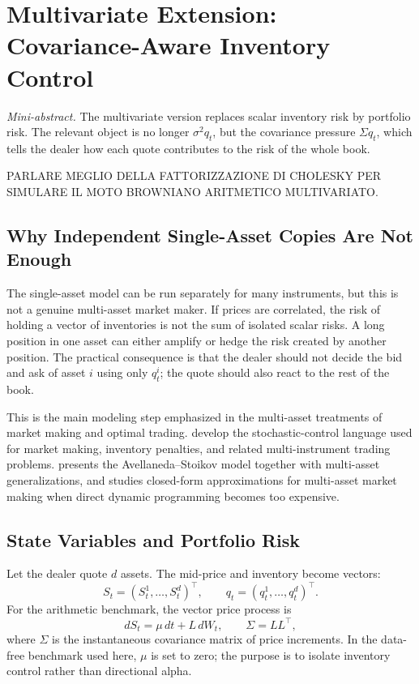 \documentclass[a4paper,10pt,titlepage,oneside,openany]{book}
\newcommand{\textcite}[1]{\cite{#1}}
\theoremstyle{plain}\newtheorem{theorem}{Theorem}[chapter]
\theoremstyle{definition}\newtheorem{definition}{Definition}[chapter]
\theoremstyle{remark}\newtheorem{remark}{Remark}[chapter]
\newcommand{\miniabstract}[1]{%
\vspace{-2pt}
\begin{tcolorbox}[colback=gray!6,colframe=black!15,boxrule=0.3pt,arc=3pt,left=6pt,right=6pt,top=4pt,bottom=4pt]
\textit{Mini-abstract.} #1
\end{tcolorbox}
\vspace{-4pt}
}
\begin{document}
\chapter{Multivariate Extension: Covariance-Aware Inventory Control}
\miniabstract{The multivariate version replaces scalar inventory risk by portfolio risk. The relevant object is no longer $\sigma^2 q_t$, but the covariance pressure $\Sigma q_t$, which tells the dealer how each quote contributes to the risk of the whole book.}

PARLARE MEGLIO DELLA FATTORIZZAZIONE DI CHOLESKY PER SIMULARE IL MOTO BROWNIANO ARITMETICO MULTIVARIATO.



\section{Why Independent Single-Asset Copies Are Not Enough}
The single-asset model can be run separately for many instruments, but this is not a genuine multi-asset market maker. If prices are correlated, the risk of holding a vector of inventories is not the sum of isolated scalar risks. A long position in one asset can either amplify or hedge the risk created by another position. The practical consequence is that the dealer should not decide the bid and ask of asset $i$ using only $q_t^i$; the quote should also react to the rest of the book.

This is the main modeling step emphasized in the multi-asset treatments of market making and optimal trading. \textcite{CarteaJaimungalPenalva2015} develop the stochastic-control language used for market making, inventory penalties, and related multi-instrument trading problems. \textcite{Gueant2016} presents the Avellaneda--Stoikov model together with multi-asset generalizations, and \textcite{BergaultEvangelistaGueantVieira2022} studies closed-form approximations for multi-asset market making when direct dynamic programming becomes too expensive.

\section{State Variables and Portfolio Risk}
Let the dealer quote $d$ assets. The mid-price and inventory become vectors:
\[
S_t=(S_t^1,\ldots,S_t^d)^\top,\qquad q_t=(q_t^1,\ldots,q_t^d)^\top .
\]
For the arithmetic benchmark, the vector price process is
\[
dS_t=\mu\,dt+L\,dW_t,\qquad \Sigma=LL^\top,
\]
where $\Sigma$ is the instantaneous covariance matrix of price increments. In the data-free benchmark used here, $\mu$ is set to zero; the purpose is to isolate inventory control rather than directional alpha.
\end{document}
